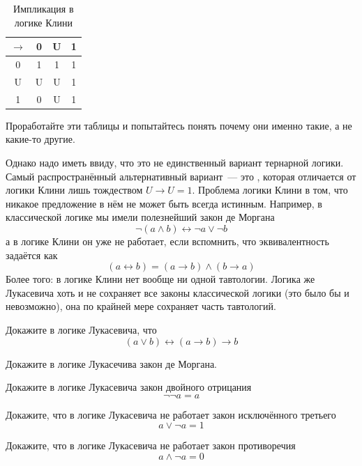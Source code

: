 \begin{table}[h]
\centering
\begin{tabular}{c | c c c}
$\to$ & 0& U& 1 \\
\hline
0 & 1 & 1 & 1 \\
U & U & U & 1\\
1 & 0 & U & 1
\end{tabular}
\caption{Импликация в логике Клини}\label{table:kleene-or}
\end{table}

Проработайте эти таблицы и попытайтесь понять почему они именно такие, а не какие-то другие.

Однако надо иметь ввиду, что это не единственный вариант тернарной логики. Самый распространённый альтернативный вариант~— это , которая отличается от логики Клини лишь тождеством $U\to U = 1$. Проблема логики Клини в том, что никакое предложение в нём не может быть всегда истинным. Например, в классической логике мы имели полезнейший закон де Моргана
$$\neg(a \land b) \leftrightarrow \neg a \lor \neg b$$
а в логике Клини он уже не работает, если вспомнить, что эквивалентность задаётся как
$$(a \leftrightarrow b) = (a\to b)\land (b\to a)$$
Более того: в логике Клини нет вообще ни одной тавтологии. Логика же Лукасевича хоть и не сохраняет все законы классической логики (это было бы и невозможно), она по крайней мере сохраняет часть тавтологий.

\begin{exercise}
Докажите в логике Лукасевича, что
$$(a\lor b) \leftrightarrow (a \to b) \to b$$
\end{exercise}

\begin{exercise}
Докажите в логике Лукасечива закон де Моргана.
\end{exercise}

\begin{exercise}
Докажите в логике Лукасевича закон двойного отрицания
$$\neg\neg a = a$$
\end{exercise}

\begin{exercise}
Докажите, что в логике Лукасевича не работает закон исключённого третьего
$$a\lor \neg a = 1$$
\end{exercise}

\begin{exercise}
Докажите, что в логике Лукасевича не работает закон противоречия
$$a\land \neg a = 0$$
\end{exercise}

